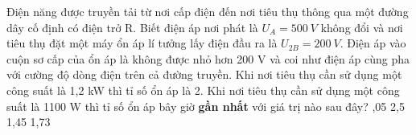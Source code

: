\begin{vidu}%
	Điện năng được truyền tải từ nơi cấp điện đến nơi tiêu thụ thông qua một đường dây cố định có điện trở R. Biết điện áp nơi phát là $U_A=500\ V$ không đổi và nơi tiêu thụ đặt một máy ổn áp lí tưởng lấy điện đầu ra là $U_{2B}=200\ V$. Điện áp vào cuộn sơ cấp của ổn áp là không được nhỏ hơn 200 V và coi như điện áp cùng pha với cường độ dòng điện trên cả đường truyền. Khi nơi tiêu thụ cần sử dụng một công suất là 1,2 kW thì tỉ số ổn áp là 2. Khi nơi tiêu thụ cần sử dụng một công suất là 1100 W thì tỉ số ổn áp bây giờ \textbf{gần nhất} với giá trị nào sau đây?
	\choice
	{,05}
	{2,5}
	{1,45}
	{1,73}
\end{vidu}

